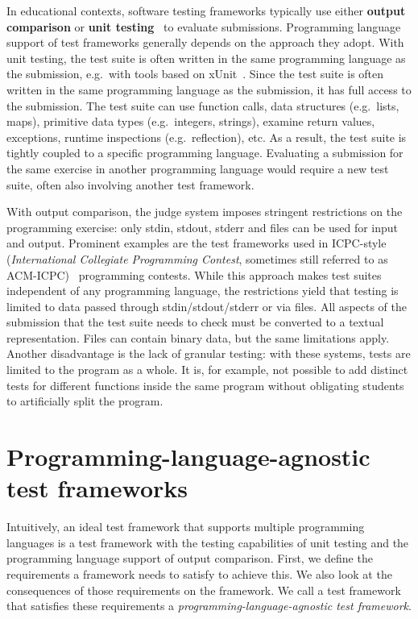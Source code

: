 \documentclass[../main]{subfiles}
\begin{document}
In educational contexts, software testing frameworks typically use either \textbf{output comparison} or \textbf{unit testing}~\autocite{paiva_automated_2022} to evaluate submissions.
Programming language support of test frameworks generally depends on the approach they adopt.
With unit testing, the test suite is often written in the same programming language as the submission, e.g.\ with tools based on xUnit~\autocite{meszaros_xunit_2007}.
Since the test suite is often written in the same programming language as the submission, it has full access to the submission.
The test suite can use function calls, data structures (e.g.\ lists, maps), primitive data types (e.g.\ integers, strings), examine return values, exceptions, runtime inspections (e.g.\ reflection), etc.
As a result, the test suite is tightly coupled to a specific programming language.
Evaluating a submission for the same exercise in another programming language would require a new test suite, often also involving another test framework.

With output comparison, the judge system imposes stringent restrictions on the programming exercise: only stdin, stdout, stderr and files can be used for input and output.
Prominent examples are the test frameworks used in ICPC-style (\emph{International Collegiate Programming Contest}, sometimes still referred to as ACM-ICPC)~\autocite{noauthor_icpc_2020} programming contests.
While this approach makes test suites independent of any programming language, the restrictions yield that testing is limited to data passed through stdin/stdout/stderr or via files.
All aspects of the submission that the test suite needs to check must be converted to a textual representation.
Files can contain binary data, but the same limitations apply.
Another disadvantage is the lack of granular testing: with these systems, tests are limited to the program as a whole.
It is, for example, not possible to add distinct tests for different functions inside the same program without obligating students to artificially split the program.

\section{Programming-language-agnostic test frameworks}\label{sec:programming-language-agnostic-test-frameworks}

Intuitively, an ideal test framework that supports multiple programming languages is a test framework with the testing capabilities of unit testing and the programming language support of output comparison.
First, we define the requirements a framework needs to satisfy to achieve this.
We also look at the consequences of those requirements on the framework.
We call a test framework that satisfies these requirements a \emph{programming-language-agnostic test framework}.
\end{document}
